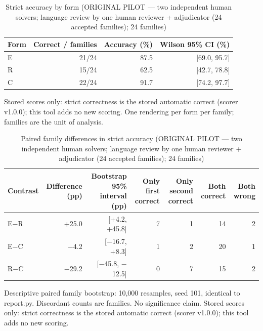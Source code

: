 \begin{table}[t]
\centering
\small
\caption{Strict accuracy by form (ORIGINAL PILOT --- two independent human solvers; language review by one human reviewer + adjudicator (24 accepted families); 24 families)}
\label{tab:pilotorig-Llama-3.2-3B-Instruct-accuracy}
\begin{tabular}{lrrr}
\toprule
Form & Correct / families & Accuracy (\%) & Wilson 95\% CI (\%) \\
\midrule
E & 21/24 & 87.5 & [69.0, 95.7] \\
R & 15/24 & 62.5 & [42.7, 78.8] \\
C & 22/24 & 91.7 & [74.2, 97.7] \\
\bottomrule
\end{tabular}
\par\smallskip
\parbox{\linewidth}{\footnotesize Stored scores only: strict correctness is the stored automatic correct (scorer v1.0.0); this tool adds no new scoring. One rendering per form per family; families are the unit of analysis.}
\end{table}

\begin{table}[t]
\centering
\small
\caption{Paired family differences in strict accuracy (ORIGINAL PILOT --- two independent human solvers; language review by one human reviewer + adjudicator (24 accepted families); 24 families)}
\label{tab:pilotorig-Llama-3.2-3B-Instruct-paired}
\begin{tabular}{lrrrrrr}
\toprule
Contrast & Difference (pp) & Bootstrap 95\% interval (pp) & Only first correct & Only second correct & Both correct & Both wrong \\
\midrule
E$-$R & +25.0 & [+4.2, +45.8] & 7 & 1 & 14 & 2 \\
E$-$C & $-$4.2 & [$-$16.7, +8.3] & 1 & 2 & 20 & 1 \\
R$-$C & $-$29.2 & [$-$45.8, $-$12.5] & 0 & 7 & 15 & 2 \\
\bottomrule
\end{tabular}
\par\smallskip
\parbox{\linewidth}{\footnotesize Descriptive paired family bootstrap: 10,000 resamples, seed 101, identical to report.py. Discordant counts are families. No significance claim. Stored scores only: strict correctness is the stored automatic correct (scorer v1.0.0); this tool adds no new scoring.}
\end{table}

